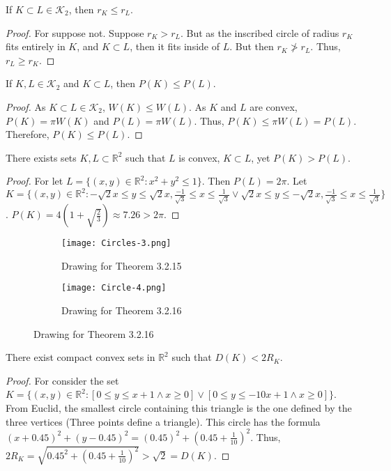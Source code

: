 \documentclass[crop=false,class=book]{standalone}
\begin{document}
\begin{theorem}
If $K\subset L \in \mathscr{K}_2$, then $r_K \leq r_L$.
\end{theorem}
\begin{proof}
For suppose not. Suppose $r_K> r_L$. But as the inscribed circle of radius $r_K$ fits entirely in $K$, and $K\subset L$, then it fits inside of $L$. But then $r_K \not > r_L$. Thus, $r_L \geq r_K$.
\end{proof}
\begin{theorem}
If $K,L\in \mathscr{K}_2$ and $K\subset L$, then $P(K)\leq P(L)$.
\end{theorem}
\begin{proof}
As $K\subset L\in  \mathscr{K}_2$, $W(K)\leq W(L)$. As $K$ and $L$ are convex, $P(K)=\pi W(K)$ and $P(L)=\pi W(L)$. Thus, $P(K) \leq \pi W(L) = P(L)$. Therefore, $P(K)\leq P(L)$.
\end{proof}
\begin{theorem}
There exists sets $K,L\subset \mathbb{R}^2$ such that $L$ is convex, $K\subset L$, yet $P(K)>P(L)$.
\end{theorem}
\begin{proof}
For let $L = \{(x,y)\in \mathbb{R}^2: x^2 + y^2 \leq 1\}$. Then $P(L) = 2\pi$. Let $K = \{(x,y)\in \mathbb{R}^2: -\sqrt{2}x\leq y \leq \sqrt{2}x,\frac{-1}{\sqrt{3}} \leq x \leq \frac{1}{\sqrt{3}} \lor \sqrt{2}x\leq y \leq -\sqrt{2}x,\frac{-1}{\sqrt{3}} \leq x \leq \frac{1}{\sqrt{3}} \}$. $P(K) = 4(1+ \sqrt{\frac{2}{3}}) \approx 7.26>2\pi$.
\end{proof}
\begin{figure}[H]
  \begin{subfigure}[b]{0.49\textwidth}
     \centering
    \texttt{[image: Circles-3.png]}
    \caption{Drawing for Theorem 3.2.15}
  \end{subfigure}
  \begin{subfigure}[b]{0.49\textwidth}
    \centering
    \texttt{[image: Circle-4.png]}
    \caption{Drawing for Theorem 3.2.16}
  \end{subfigure}
\end{figure}
\begin{theorem}
There exist compact convex sets in $\mathbb{R}^2$ such that $D(K) < 2R_K$.
\end{theorem}
\begin{proof}
For consider the set $K=\{(x,y)\in \mathbb{R}^2: [0\leq y\leq x+1 \land x\geq 0]\lor [0\leq y\leq -10x+1\land x\geq 0]\}$. From Euclid, the smallest circle containing this triangle is the one defined by the three vertices (Three points define a triangle). This circle has the formula $(x+0.45)^2+(y-0.45)^2 = (0.45)^2 +(0.45+\frac{1}{10})^2$. Thus, $2R_K = \sqrt{0.45^2 +(0.45+\frac{1}{10})^2} > \sqrt{2} = D(K)$.
\end{proof}
\end{document}
